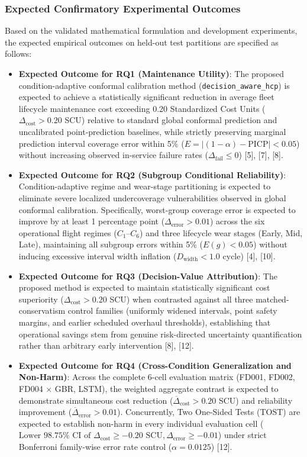 \documentclass[12pt,a4paper]{article}
\begin{document}
\subsubsection*{Expected Confirmatory Experimental Outcomes}
Based on the validated mathematical formulation and development experiments, the expected empirical outcomes on held-out test partitions are specified as follows:
\begin{itemize}
    \item \textbf{Expected Outcome for RQ1 (Maintenance Utility)}: The proposed condition-adaptive conformal calibration method (\texttt{decision\_aware\_hcp}) is expected to achieve a statistically significant reduction in average fleet lifecycle maintenance cost exceeding 0.20 Standardized Cost Units ($\Delta_{\text{cost}} > 0.20$ SCU) relative to standard global conformal prediction and uncalibrated point-prediction baselines, while strictly preserving marginal prediction interval coverage error within 5\% ($E = |(1-\alpha) - \text{PICP}| < 0.05$) without increasing observed in-service failure rates ($\Delta_{\text{fail}} \le 0$) [5], [7], [8].
    \item \textbf{Expected Outcome for RQ2 (Subgroup Conditional Reliability)}: Condition-adaptive regime and wear-stage partitioning is expected to eliminate severe localized undercoverage vulnerabilities observed in global conformal calibration. Specifically, worst-group coverage error is expected to improve by at least 1 percentage point ($\Delta_{\text{error}} > 0.01$) across the six operational flight regimes ($C_1$--$C_6$) and three lifecycle wear stages (Early, Mid, Late), maintaining all subgroup errors within 5\% ($E(g) < 0.05$) without inducing excessive interval width inflation ($D_{\text{width}} < 1.0$ cycle) [4], [10].
    \item \textbf{Expected Outcome for RQ3 (Decision-Value Attribution)}: The proposed method is expected to maintain statistically significant cost superiority ($\Delta_{\text{cost}} > 0.20$ SCU) when contrasted against all three matched-conservatism control families (uniformly widened intervals, point safety margins, and earlier scheduled overhaul thresholds), establishing that operational savings stem from genuine risk-directed uncertainty quantification rather than arbitrary early intervention [8], [12].
    \item \textbf{Expected Outcome for RQ4 (Cross-Condition Generalization and Non-Harm)}: Across the complete 6-cell evaluation matrix (FD001, FD002, FD004 $\times$ GBR, LSTM), the weighted aggregate contrast is expected to demonstrate simultaneous cost reduction ($\overline{\Delta}_{\text{cost}} > 0.20$ SCU) and reliability improvement ($\overline{\Delta}_{\text{error}} > 0.01$). Concurrently, Two One-Sided Tests (TOST) are expected to establish non-harm in every individual evaluation cell ($\text{Lower } 98.75\% \text{ CI of } \Delta_{\text{cost}} \ge -0.20\text{ SCU}, \Delta_{\text{error}} \ge -0.01$) under strict Bonferroni family-wise error rate control ($\alpha = 0.0125$) [12].
\end{itemize}
\end{document}
